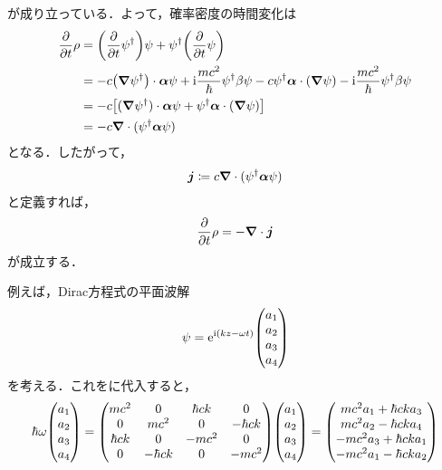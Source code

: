 \documentclass{report}
\begin{document}
    が成り立っている．よって，確率密度の時間変化は
    \begin{align}
      \pdv{t}\rho &= \qty(\pdv{t}\psi^{\dagger})\psi + \psi^{\dagger}\qty(\pdv{t}\psi)\\
      &= -c\qty(\grad\psi^{\dagger})\cdot \bm{\alpha}\psi + \mathrm{i}\frac{mc^2}{\hbar}\psi^{\dagger}\beta\psi - c\psi^{\dagger}\bm{\alpha}\cdot(\grad\psi) - \mathrm{i}\frac{mc^2}{\hbar}\psi^{\dagger}\beta\psi\\
      &= -c\qty[(\grad\psi^{\dagger})\cdot \bm{\alpha}\psi + \psi^{\dagger}\bm{\alpha}\cdot(\grad\psi)]\\
      &= -c\grad\cdot(\psi^{\dagger}\bm{\alpha}\psi)
    \end{align}
    となる．したがって，
    \begin{align}
      \bm{j} \coloneqq c\grad\cdot(\psi^{\dagger}\bm{\alpha}\psi)
    \end{align}
    と定義すれば，
    \begin{align}
      \pdv{t}\rho = -\grad\cdot \bm{j}
    \end{align}
    が成立する．
    \par
    例えば，Dirac方程式の平面波解
    \begin{align}
      \psi = \e^{\i(kz - \omega t)}
      \mqty(
        a_1\\a_2\\a_3\\a_4
      )
    \end{align}
    を考える．これをに代入すると，
    \begin{align}
      \hbar\omega
      \mqty(
        a_1\\ a_2\\ a_3\\ a_4
      )
      =
      \mqty(
        mc^2 & 0 & \hbar ck & 0\\
        0 & mc^2 & 0 & -\hbar ck \\
        \hbar ck & 0 & -mc^2 & 0\\
        0 & -\hbar ck & 0 & -mc^2
      )
      \mqty(
        a_1\\a_2\\a_3\\a_4
      )
      =
      \mqty(
        mc^2 a_1 + \hbar c k a_3\\
        mc^2 a_2 - \hbar c k a_4\\
        -mc^2 a_3 + \hbar c k a_1\\
        -mc^2 a_1 - \hbar c k a_2
      )\label{plane-wave-in-dirac}
    \end{align}
\end{document}
